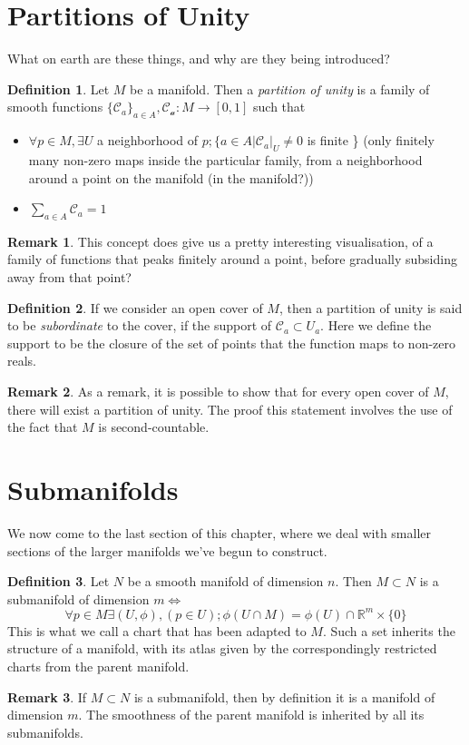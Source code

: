 \documentclass[12pt]{book}
\theoremstyle{definition}
\newtheorem*{definition}{Definition}
\newtheorem*{remark}{Remark}
\begin{document}
\section{Partitions of Unity}
What on earth are these things, and why are they being introduced?
\begin{definition}
    Let $M$ be a manifold. Then a \textit{partition of unity} is a family of smooth functions $\{\mathcal{C}_a\}_{a \in A}, \mathcal{C_a}: M \to [0, 1]$ such that \begin{itemize}
        \item $\forall p \in M, \exists U$ a neighborhood of $p; \{a \in A| \mathcal{C}_a |_U \neq 0$ is finite \} (only finitely many non-zero maps inside the particular family, from a neighborhood around a point on the manifold (in the manifold?))
        \item $\sum_{a \in A} \mathcal{C}_a = 1$
    \end{itemize}
\end{definition}
\begin{remark}
    This concept does give us a pretty interesting visualisation, of a family of functions that peaks finitely around a point, before gradually subsiding away from that point?
\end{remark}
\begin{definition}
    If we consider an open cover of $M$, then a partition of unity is said to be \textit{subordinate} to the cover, if the support of $\mathcal{C}_a \subset U_a$. Here we define the support to be the closure of the set of points that the function maps to non-zero reals.
\end{definition}
\begin{remark}
    As a remark, it is possible to show that for every open cover of $M$, there will exist a partition of unity. The proof this statement involves the use of the fact that $M$ is second-countable.
\end{remark}
\section{Submanifolds}
We now come to the last section of this chapter, where we deal with smaller sections of the larger manifolds we've begun to construct.
\begin{definition}
    Let $N$ be a smooth manifold of dimension $n$. Then $M \subset N$ is a submanifold of dimension $m \iff$ 
    $$\forall p \in M \exists (U, \phi), (p \in U); \phi (U \cap M) = \phi(U) \cap \mathbb{R}^m\times\{0\}$$ This is what we call a chart that has been adapted to $M$. Such a set inherits the structure of a manifold, with its atlas given by the correspondingly restricted charts from the parent manifold.
\end{definition}
\begin{remark}
    If $M \subset N$ is a submanifold, then by definition it is a manifold of dimension $m$. The smoothness of the parent manifold is inherited by all its submanifolds.
\end{remark}
\end{document}
